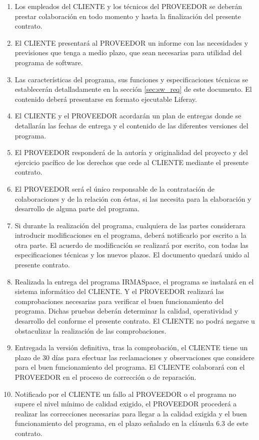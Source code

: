 \begin{description}[style=nextline]
\begin{enumerate}
\begin{enumerate}
  	\item  Los empleados del CLIENTE y los técnicos del PROVEEDOR se deberán prestar colaboración en todo momento y hasta la finalización del presente contrato.
  	\item El CLIENTE presentará al PROVEEDOR un informe con las necesidades y previsiones que tenga a medio plazo, que sean necesarias para utilidad del programa de software.
  	\item Las características del programa, sus funciones y especificaciones técnicas se establecerán detalladamente en la sección \ref{sec:sw_req} de este documento. El contenido deberá presentarse en formato ejecutable Liferay.
  	\item El CLIENTE y el PROVEEDOR acordarán un plan de entregas donde se detallarán las fechas de entrega y el contenido de las diferentes versiones del programa.
  	\item El PROVEEDOR responderá de la autoría y originalidad del proyecto y del ejercicio pacífico de los derechos que cede al CLIENTE mediante el presente contrato.
  	\item El PROVEEDOR será el único responsable de la contratación de colaboraciones y de la relación con éstas, si las necesita para la elaboración y desarrollo de alguna parte del programa.
  	\item Si durante la realización del programa, cualquiera de las partes considerara introducir modificaciones en el programa, deberá notificarlo por escrito a la otra parte. El acuerdo de modificación se realizará por escrito, con todas las especificaciones técnicas y los nuevos plazos. El documento quedará unido al presente contrato.
  	\item Realizada la entrega del programa IRMASpace, el programa se instalará en el sistema informático del CLIENTE. Y el PROVEEDOR realizará las comprobaciones necesarias para verificar el buen funcionamiento del programa. Dichas pruebas deberán determinar la calidad, operatividad y desarrollo del conforme el presente contrato. El CLIENTE no podrá negarse u obstaculizar la realización de las comprobaciones.
  \item Entregada la versión definitiva, tras la comprobación, el CLIENTE tiene un plazo de 30 días para efectuar las reclamaciones y observaciones que considere para el buen funcionamiento del programa. El CLIENTE colaborará con el PROVEEDOR en el proceso de corrección o de reparación.
  \item Notificado por el CLIENTE un fallo al PROVEEDOR o el programa no supere el nivel mínimo de calidad exigido, el PROVEEDOR procederá a realizar las correcciones necesarias para llegar a la calidad exigida y el buen funcionamiento del programa, en el plazo señalado en la cláusula 6.3 de este contrato.

\end{enumerate}
\end{enumerate}
\end{description}
